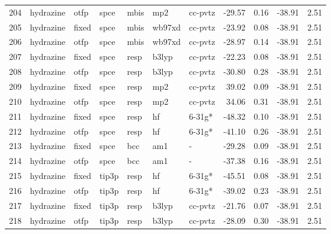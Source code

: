 \begin{tabular}{lllllllrrrr}
204 &                     hydrazine &   otfp &   spce &   mbis &     mp2 &      cc-pvtz &      -29.57 &     0.16 &      -38.91 &      2.51 \\
205 &                     hydrazine &  fixed &   spce &   mbis &  wb97xd &      cc-pvtz &      -23.92 &     0.08 &      -38.91 &      2.51 \\
206 &                     hydrazine &   otfp &   spce &   mbis &  wb97xd &      cc-pvtz &      -28.97 &     0.14 &      -38.91 &      2.51 \\
207 &                     hydrazine &  fixed &   spce &   resp &   b3lyp &      cc-pvtz &      -22.23 &     0.08 &      -38.91 &      2.51 \\
208 &                     hydrazine &   otfp &   spce &   resp &   b3lyp &      cc-pvtz &      -30.80 &     0.28 &      -38.91 &      2.51 \\
209 &                     hydrazine &  fixed &   spce &   resp &     mp2 &      cc-pvtz &       39.02 &     0.09 &      -38.91 &      2.51 \\
210 &                     hydrazine &   otfp &   spce &   resp &     mp2 &      cc-pvtz &       34.06 &     0.31 &      -38.91 &      2.51 \\
211 &                     hydrazine &  fixed &   spce &   resp &      hf &       6-31g* &      -48.32 &     0.10 &      -38.91 &      2.51 \\
212 &                     hydrazine &   otfp &   spce &   resp &      hf &       6-31g* &      -41.10 &     0.26 &      -38.91 &      2.51 \\
213 &                     hydrazine &  fixed &   spce &    bcc &     am1 &            - &      -29.28 &     0.09 &      -38.91 &      2.51 \\
214 &                     hydrazine &   otfp &   spce &    bcc &     am1 &            - &      -37.38 &     0.16 &      -38.91 &      2.51 \\
215 &                     hydrazine &  fixed &  tip3p &   resp &      hf &       6-31g* &      -45.51 &     0.08 &      -38.91 &      2.51 \\
216 &                     hydrazine &   otfp &  tip3p &   resp &      hf &       6-31g* &      -39.02 &     0.23 &      -38.91 &      2.51 \\
217 &                     hydrazine &  fixed &  tip3p &   resp &   b3lyp &      cc-pvtz &      -21.76 &     0.07 &      -38.91 &      2.51 \\
218 &                     hydrazine &   otfp &  tip3p &   resp &   b3lyp &      cc-pvtz &      -28.09 &     0.30 &      -38.91 &      2.51 \\

\end{tabular}
